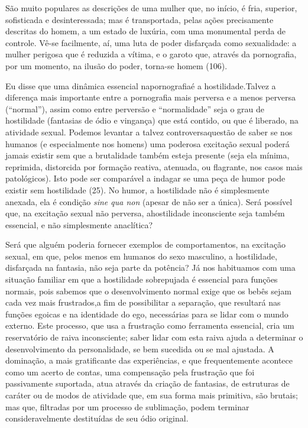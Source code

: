 São muito populares as descrições de uma mulher que, no início, é
fria, superior, sofisticada e desinteressada; mas é transportada, pelas
ações precisamente descritas do homem, a um estado de luxúria, com uma
monumental perda de controle. Vê-se facilmente, aí, uma luta de poder
disfarçada como sexualidade: a mulher perigosa que é reduzida a vítima,
e o garoto que, através da pornografia, por um momento, na ilusão do
poder, torna-se homem (106).\idxpornoviti[|)]

Eu disse que uma dinâmica essencial na\idxsexuehos[|(] pornografia\idxpornohost[|(] é a hostilidade.\idxhostporn[|(]
Talvez a diferença mais importante entre a pornografia mais perversa e
a menos perversa (``normal''), assim como
entre perversão e ``normalidade'' seja o
grau de hostilidade (fantasias de ódio e vingança) que está contido, ou
que é liberado, na atividade sexual. Podemos levantar a talvez
controversa\idxhostexci[|(] questão de saber se nos humanos (e especialmente nos
homens) uma poderosa excitação sexual poderá jamais existir sem que a
brutalidade também esteja presente (seja ela mínima, reprimida,
distorcida por formação reativa, atenuada, ou flagrante, nos casos mais
patológicos). Isto pode ser comparável a indagar se uma peça de humor
pode existir sem hostilidade (25). No humor, a hostilidade não é
simplesmente anexada, ela é condição \textit{sine qua non} (apesar de não ser a
única). Será possível que, na excitação sexual não perversa, a\idxpornohete[|)]
hostilidade inconsciente seja também essencial, e não simplesmente
anaclítica?

Será que alguém poderia fornecer exemplos de comportamentos, na
excitação sexual, em que, pelos menos em humanos do sexo masculino, a
hostilidade,\idxhostdese{} disfarçada na fantasia, não seja parte da potência? Já nos
habituamos com uma situação familiar em que a hostilidade sobrepujada é
essencial para funções normais, pois sabemos que o desenvolvimento\idxegoi{}
normal exige que os bebês sejam cada vez mais frustrados,\idxinfanfrust[|(] a fim de
possibilitar a separação,\idxinfanego{} que resultará nas funções egoicas e na
identidade do ego, necessárias para se lidar com o mundo externo. Este
processo, que usa a frustração como ferramenta essencial, cria um
reservatório de raiva inconsciente; saber lidar com esta raiva ajuda a
determinar o desenvolvimento da personalidade, se bem sucedida ou se
mal ajustada. A dominação, a mais gratificante das experiências, e que
frequentemente acontece como um acerto de contas, uma compensação pela
frustração que foi passivamente suportada, atua através da criação de
fantasias, de estruturas de caráter ou de modos de atividade que, em
sua forma mais primitiva, são brutais; mas que, filtradas por um
processo de sublimação, podem terminar consideravelmente destituídas de
seu ódio original.

